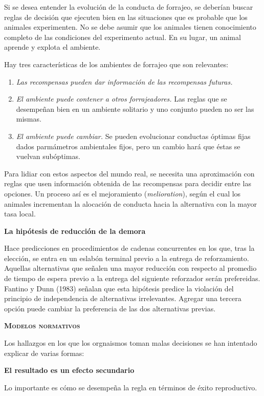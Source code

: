\documentclass[a4paper,12pt]{article}
\begin{document}
\begin{bfseries}
	Si se desea entender la evolución de la conducta de forrajeo, se deberían buscar reglas de decisión que ejecuten bien en las situaciones que es probable que los animales experimenten. No se debe asumir que los animales tienen conocimiento completo de las condiciones del experimento actual. En su lugar, un animal aprende y explota el ambiente.
\end{bfseries}

Hay tres características de los ambientes de forrajeo que son relevantes:
\begin{enumerate}
	\item {\itshape Las recompensas pueden dar información de las recompensas futuras.}
	\item {\itshape El ambiente puede contener a otros forrajeadores.} Las reglas que se desempeñan bien en un ambiente solitario y uno conjunto pueden no ser las mismas.
	\item {\itshape El ambiente puede cambiar.} Se pueden evolucionar conductas óptimas fijas dados parmámetros ambientales fijos, pero un cambio hará que éstas se vuelvan subóptimas.
\end{enumerate}

Para lidiar con estos aspectos del mundo real, se necesita una aproximación con reglas que usen información obtenida de las recompensas para decidir entre las opciones. Un proceso así es el mejoramiento ({\itshape melioration}), según el cual los animales incrementan la alocación de conducta hacia la alternativa con la mayor tasa local.

{\bfseries La hipótesis de reducción de la demora}

Hace predicciones en procedimientos de cadenas concurrentes en los que, tras la elección, se entra en un eslabón terminal previo a la entrega de reforzamiento. Aquellas alternativas que señalen una mayor reducción con respecto al promedio de tiempo de espera previo a la entrega del siguiente reforzador serán prefereidas. Fantino y Dunn (1983) señalan que esta hipótesis predice la violación del principio de independencia de alternativas irrelevantes. Agregar una tercera opción puede cambiar la preferencia de las dos alternativas previas.

{\scshape\bfseries Modelos normativos}

Los hallazgos en los que los orgnaismos toman malas decisiones se han intentado explicar de varias formas:

{\bfseries El resultado es un efecto secundario}

Lo importante es cómo se desempeña la regla en términos de éxito reproductivo. 
\end{document}
